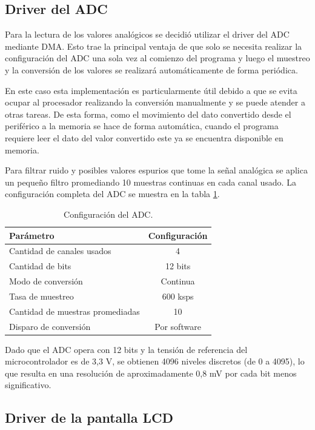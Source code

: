 \subsection{Driver del ADC}

Para la lectura de los valores analógicos se decidió utilizar el driver del ADC mediante DMA. Esto trae la principal ventaja de que solo se necesita realizar la configuración del ADC una sola vez al comienzo del programa y luego el muestreo y la conversión de los valores se realizará automáticamente de forma periódica.

En este caso esta implementación es particularmente útil debido a que se evita ocupar al procesador realizando la conversión manualmente y se puede atender a otras tareas. De esta forma, como el movimiento del dato convertido desde el periférico a la memoria se hace de forma automática, cuando el programa requiere leer el dato del valor convertido este ya se encuentra disponible en memoria.

Para filtrar ruido y posibles valores espurios que tome la señal analógica se aplica un pequeño filtro promediando 10 muestras continuas en cada canal usado. La configuración completa del ADC se muestra en la tabla \ref{tab:configADC}.

\begin{table}[H]
	\centering
	\caption{Configuración del ADC.}
	\begin{tabular}{l c}
		\toprule
		\textbf{Parámetro} & \textbf{Configuración}  \\
		\midrule
		Cantidad de canales usados & 4		\\
		Cantidad de bits		& 12 bits 	 		 \\
		Modo de conversión		& Continua   \\
		Tasa de muestreo		& 600 ksps	 \\
		Cantidad de muestras promediadas	& 10 \\
		Disparo de conversión	& Por software \\
		\bottomrule
		\hline
	\end{tabular}
	\label{tab:configADC}
\end{table}

Dado que el ADC opera con 12 bits y la tensión de referencia del microcontrolador es de 3,3 V, se obtienen 4096 niveles discretos (de 0 a 4095), lo que resulta en una resolución de aproximadamente 0,8 mV por cada bit menos significativo.

\subsection{Driver de la pantalla LCD}

